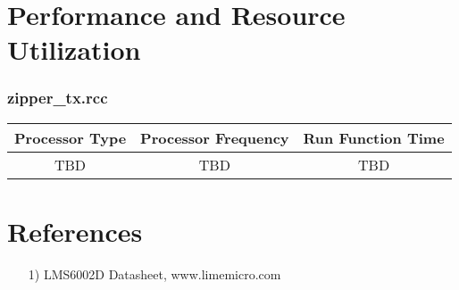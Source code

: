 \documentclass{article}
\def\comp{zipper\_tx}
\begin{document}
\section*{Performance and Resource Utilization}
\subsubsection*{\comp.rcc}
\begin{scriptsize}
	\begin{tabular}{|c|c|c|}
		\hline
		\rowcolor{blue}
		Processor Type & Processor Frequency & Run Function Time \\
		\hline
		TBD            & TBD                 & TBD               \\
		\hline
	\end{tabular}
\end{scriptsize}


\section*{References}
\begin{itemize}
	\item[1)] LMS6002D Datasheet, www.limemicro.com
\end{itemize}
\end{document}
